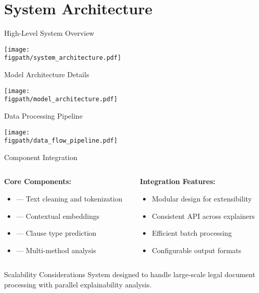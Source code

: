 
\section{System Architecture}

\begin{frame}{High-Level System Overview}
\begin{center}
\texttt{[image: \\figpath/system\_architecture.pdf]}
\end{center}
\end{frame}

\begin{frame}{Model Architecture Details}
\begin{center}
\texttt{[image: \\figpath/model\_architecture.pdf]}
\end{center}
\end{frame}

\begin{frame}{Data Processing Pipeline}
\begin{center}
\texttt{[image: \\figpath/data\_flow\_pipeline.pdf]}
\end{center}
\end{frame}

\begin{frame}{Component Integration}
\begin{columns}
\begin{column}{0.5\textwidth}
\textbf{Core Components:}
\begin{itemize}
    \item {} --- Text cleaning and tokenization
    \item {} --- Contextual embeddings
    \item {} --- Clause type prediction
    \item {} --- Multi-method analysis
\end{itemize}
\end{column}
\begin{column}{0.5\textwidth}
\textbf{Integration Features:}
\begin{itemize}
    \item Modular design for extensibility
    \item Consistent API across explainers
    \item Efficient batch processing
    \item Configurable output formats
\end{itemize}
\end{column}
\end{columns}

\vspace{0.5cm}
\begin{alertblock}{Scalability Considerations}
System designed to handle large-scale legal document processing with parallel explainability analysis.
\end{alertblock}
\end{frame}


